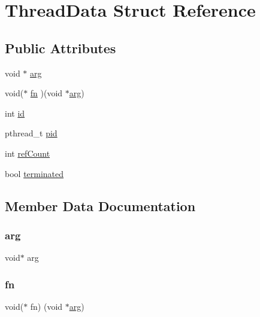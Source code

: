 \hypertarget{structThreadData}{}\section{Thread\+Data Struct Reference}
\label{structThreadData}
\subsection*{Public Attributes}
\begin{DoxyCompactItemize}
\item 
void $\ast$ \mbox{\hyperlink{structThreadData_a9ce2ec4812a92cb6ab39f6e81e9173a9}{arg}}
\item 
void($\ast$ \mbox{\hyperlink{structThreadData_a8667cc40192cd3e4751848527772ebdc}{fn}} )(void $\ast$\mbox{\hyperlink{structThreadData_a9ce2ec4812a92cb6ab39f6e81e9173a9}{arg}})
\item 
int \mbox{\hyperlink{structThreadData_a7441ef0865bcb3db9b8064dd7375c1ea}{id}}
\item 
pthread\+\_\+t \mbox{\hyperlink{structThreadData_a7c985d404b7736d1398a5e5cc33ce683}{pid}}
\item 
int \mbox{\hyperlink{structThreadData_a43ab0d8eafd71383b2233bdee65911de}{ref\+Count}}
\item 
bool \mbox{\hyperlink{structThreadData_ad1aea42fae01ba0d2917114d189a9d36}{terminated}}
\end{DoxyCompactItemize}


\subsection{Member Data Documentation}
\mbox{\label{structThreadData_a9ce2ec4812a92cb6ab39f6e81e9173a9}} 
\subsubsection{\texorpdfstring{arg}{arg}}
{\footnotesize\ttfamily void$\ast$ arg}

\mbox{\label{structThreadData_a8667cc40192cd3e4751848527772ebdc}} 
\subsubsection{\texorpdfstring{fn}{fn}}
{\footnotesize\ttfamily void($\ast$  fn) (void $\ast$\mbox{\hyperlink{structThreadData_a9ce2ec4812a92cb6ab39f6e81e9173a9}{arg}})}

